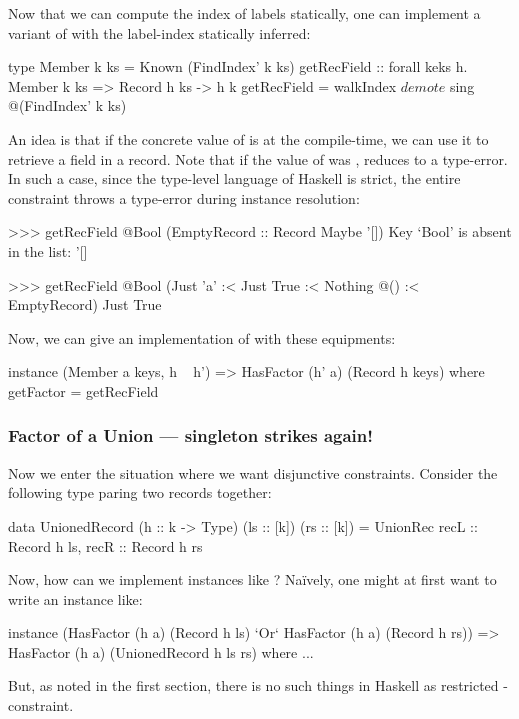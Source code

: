 \documentclass[demotion-paper.tex]{subfiles}
\begin{document}
Now that we can compute the index of labels statically, one can implement a variant of  with the label-index statically inferred:
\begin{code}
type Member k ks = Known (FindIndex' k ks)
getRecField :: forall keks h. Member k ks
  => Record h ks -> h k
getRecField = walkIndex $ demote $ sing @(FindIndex' k ks)
\end{code}
An idea is that if the concrete value of  is  at the compile-time, we can use it to retrieve a field in a record.
Note that if the value of  was ,  reduces to a type-error.
In such a case, since the type-level language of Haskell is strict, the entire constraint  throws a type-error during instance resolution:
\begin{repl}
>>> getRecField @Bool (EmptyRecord :: Record Maybe '[])
Key `Bool' is absent in the list: '[]

>>> getRecField @Bool (Just 'a' :< Just True :< Nothing @() :< EmptyRecord)
Just True
\end{repl}

Now, we can give an implementation of  with these equipments:
\begin{code}
instance (Member a keys, h ~ h') => HasFactor (h' a) (Record h keys) where
  getFactor = getRecField
\end{code}

\subsubsection{Factor of a Union --- singleton strikes again!}
Now we enter the situation where we want disjunctive constraints.
Consider the following type paring two records together:
\begin{code}
data UnionedRecord (h :: k -> Type) (ls :: [k]) (rs :: [k]) = 
  UnionRec { recL :: Record h ls, recR :: Record h rs }
\end{code}
Now, how can we implement instances like ?
Na\"{i}vely, one might at first want to write an instance like:
\begin{code}
instance (HasFactor (h a) (Record h ls) `Or` HasFactor (h a) (Record h rs))
      => HasFactor (h a) (UnionedRecord h ls rs) where ...
\end{code}
But, as noted in the first section, there is no such things in Haskell as restricted -constraint.
\end{document}
